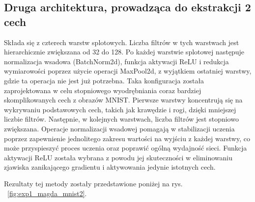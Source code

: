 \documentclass[10pt]{article}
\begin{document}
\subsection*{Druga architektura, prowadząca do ekstrakcji 2 cech}
Składa się z czterech warstw splotowych. Liczba filtrów w tych warstwach jest hierarchicznie zwiększana od 32 do 128. Po każdej warstwie splotowej następuje normalizacja wsadowa (BatchNorm2d), funkcja aktywacji ReLU i redukcja wymiarowości poprzez użycie operacji MaxPool2d, z wyjątkiem ostatniej warstwy, gdzie ta operacja nie jest już potrzebna.
Taka konfiguracja została zaprojektowana w celu stopniowego wyodrębniania coraz bardziej skomplikowanych cech z obrazów MNIST. Pierwsze warstwy koncentrują się na wykrywaniu podstawowych cech, takich jak krawędzie i rogi, dzięki mniejszej liczbie filtrów. Następnie, w kolejnych warstwach, liczba filtrów jest stopniowo zwiększana.
Operacje normalizacji wsadowej pomagają w stabilizacji uczenia poprzez zapewnienie jednolitego zakresu wartości na wyjściu z każdej warstwy, co może przyspieszyć proces uczenia oraz poprawić ogólną wydajność sieci. Funkcja aktywacji ReLU została wybrana z powodu jej skuteczności w eliminowaniu zjawiska zanikającego gradientu i aktywowania jedynie istotnych cech.

Rezultaty tej metody zostały przedstawione poniżej na rys. ~\ref{fig:exp1_magda_mnist2}.

\MagdaMnistSmall{}
\end{document}
